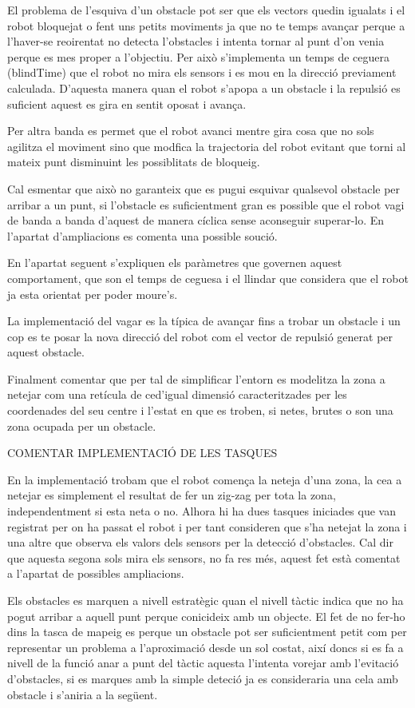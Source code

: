 El problema de l'esquiva d'un obstacle pot ser que els vectors quedin igualats i el robot bloquejat
o fent uns petits moviments ja que no te temps avançar perque a l'haver-se reoirentat no detecta l'obstacles
i intenta  tornar al punt d'on venia perque es mes proper a l'objectiu. Per això s'implementa un temps de
ceguera (blindTime) que el robot no mira els sensors i es mou en la direcció previament calculada.
D'aquesta manera quan el robot s'apopa a un obstacle i la repulsió
es suficient aquest es gira en sentit oposat i avança.

Per altra banda es permet que el robot avanci mentre gira cosa que no sols agilitza el moviment sino que
modfica la trajectoria del robot evitant que torni al mateix punt disminuint les possiblitats de bloqueig.

Cal esmentar que això no garanteix que es pugui esquivar qualsevol obstacle per arribar a un punt, 
si l'obstacle es suficientment gran es possible que el robot vagi de banda a banda d'aquest de manera
cíclica sense aconseguir superar-lo. En l'apartat d'ampliacions es comenta una possible so\lgem ució.

En l'apartat seguent s'expliquen els paràmetres que governen aquest comportament, que son el temps
de ceguesa i el llindar que considera que el robot ja esta orientat per poder moure's.

La implementació del vagar es la típica de avançar fins a trobar un obstacle i un cop es te posar 
la nova direcció del robot com el vector de repulsió generat per aquest obstacle.

Finalment comentar que per tal de simplificar l'entorn es modelitza la zona a netejar com una retícula
de ce\lgem d'igual dimensió caracteritzades per les coordenades del seu centre i l'estat en que es troben,
si netes, brutes o son una zona ocupada per un obstacle.


COMENTAR IMPLEMENTACIÓ DE LES TASQUES

En la implementació trobam que el robot comença la neteja d'una zona, la ce\lgem a a netejar es simplement
el resultat de fer un zig-zag per tota la zona, independentment si esta neta o no. Alhora hi ha dues tasques
iniciades que van registrat per on ha passat el robot i per tant consideren que s'ha netejat la zona i una altre
que observa els valors dels sensors per la detecció d'obstacles. Cal dir que aquesta segona sols mira els sensors,
no fa res més, aquest fet està comentat a l'apartat de possibles ampliacions.

Els obstacles es marquen a nivell estratègic quan el nivell tàctic indica que no ha pogut arribar a aquell punt perque conicideix 
amb un objecte. El fet de no fer-ho dins la tasca de mapeig es perque un obstacle pot ser suficientment petit
com per representar un problema a l'aproximació desde un sol costat, així doncs si es fa a nivell de la funció
anar a punt del tàctic aquesta l'intenta vorejar amb l'evitació d'obstacles, si es marques amb la simple deteció
ja es consideraria una cela amb obstacle i s'aniria a la següent.
 